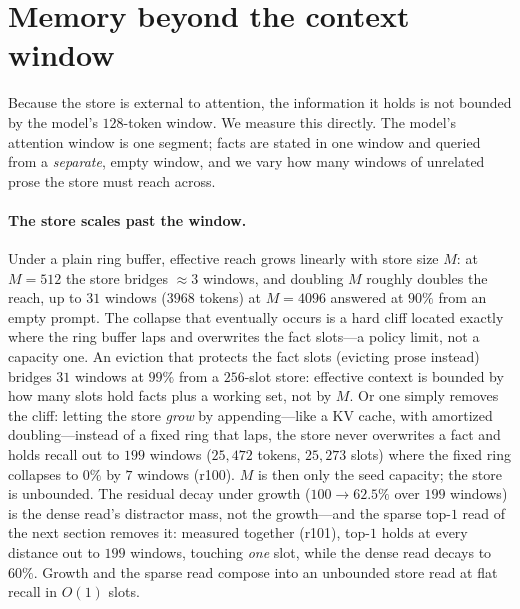 \section{Memory beyond the context window}
\label{sec:longcontext}

Because the store is external to attention, the information it holds is not bounded
by the model's $128$-token window. We measure this directly. The model's attention
window is one segment; facts are stated in one window and queried from a
\emph{separate}, empty window, and we vary how many windows of unrelated prose the
store must reach across.

\paragraph{The store scales past the window.} Under a plain ring buffer, effective
reach grows linearly with store size $M$: at $M=512$ the store bridges $\approx3$
windows, and doubling $M$ roughly doubles the reach, up to $31$ windows
($3968$ tokens) at $M=4096$ answered at $90\%$ from an empty prompt. The collapse
that eventually occurs is a hard cliff located exactly where the ring buffer laps
and overwrites the fact slots---a policy limit, not a capacity one. An eviction
that protects the fact slots (evicting prose instead) bridges $31$ windows at
$99\%$ from a $256$-slot store: effective context is bounded by how many slots hold
facts plus a working set, not by $M$. Or one simply removes the cliff: letting the
store \emph{grow} by appending---like a KV cache, with amortized doubling---instead of
a fixed ring that laps, the store never overwrites a fact and holds recall out to
$199$ windows ($25{,}472$ tokens, $25{,}273$ slots) where the fixed ring collapses to
$0\%$ by $7$ windows (r100). $M$ is then only the seed capacity; the store is unbounded.
The residual decay under growth ($100\!\to\!62.5\%$ over $199$ windows) is the dense
read's distractor mass, not the growth---and the sparse top-$1$ read of the next section
removes it: measured together (r101), top-$1$ holds  at every distance out to
$199$ windows, touching \emph{one} slot, while the dense read decays to $60\%$. Growth and
the sparse read compose into an unbounded store read at flat recall in $O(1)$ slots.

